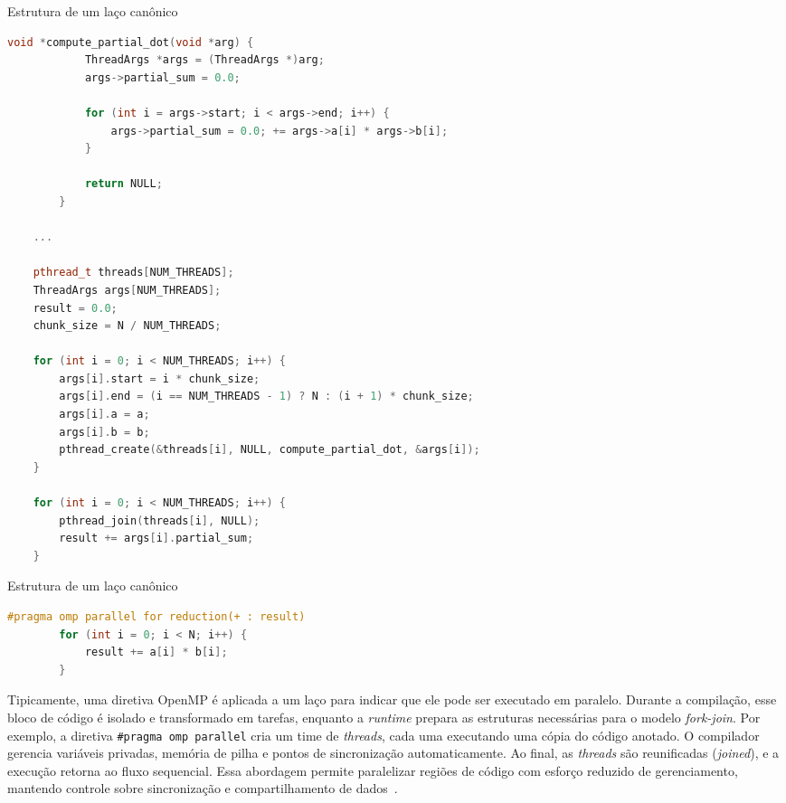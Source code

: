 \begin{sourcecode}[htb]\caption{\label{code:produtoThread}Estrutura de um laço canônico}
    \begin{lstlisting}[frame=single, language=C++]
        void *compute_partial_dot(void *arg) {
            ThreadArgs *args = (ThreadArgs *)arg;
            args->partial_sum = 0.0;
            
            for (int i = args->start; i < args->end; i++) {
                args->partial_sum = 0.0; += args->a[i] * args->b[i];
            }

            return NULL;
        }

    ...

    pthread_t threads[NUM_THREADS];
    ThreadArgs args[NUM_THREADS];
    result = 0.0;
    chunk_size = N / NUM_THREADS;

    for (int i = 0; i < NUM_THREADS; i++) {
        args[i].start = i * chunk_size;
        args[i].end = (i == NUM_THREADS - 1) ? N : (i + 1) * chunk_size;
        args[i].a = a;
        args[i].b = b;
        pthread_create(&threads[i], NULL, compute_partial_dot, &args[i]);
    }

    for (int i = 0; i < NUM_THREADS; i++) {
        pthread_join(threads[i], NULL);
        result += args[i].partial_sum;    
    }
    \end{lstlisting}
    \fonte{}
\end{sourcecode}

\begin{sourcecode}[htb]\caption{\label{code:produtoOmp}Estrutura de um laço canônico}
    \begin{lstlisting}[frame=single, language=C++]
        #pragma omp parallel for reduction(+ : result)
        for (int i = 0; i < N; i++) {
            result += a[i] * b[i];
        }
    \end{lstlisting}
    \fonte{}
\end{sourcecode}

Tipicamente, uma diretiva OpenMP é aplicada a um laço para indicar que ele pode ser executado em paralelo. Durante a compilação, esse bloco de código é isolado e transformado em tarefas, enquanto a \textit{runtime} prepara as estruturas necessárias para o modelo \textit{fork-join}. Por exemplo, a diretiva \texttt{\#pragma omp parallel} cria um time de \textit{threads}, cada uma executando uma cópia do código anotado. O compilador gerencia variáveis privadas, memória de pilha e pontos de sincronização automaticamente. Ao final, as \textit{threads} são reunificadas (\textit{joined}), e a execução retorna ao fluxo sequencial. Essa abordagem permite paralelizar regiões de código com esforço reduzido de gerenciamento, mantendo controle sobre sincronização e compartilhamento de dados~\cite{mattson2019}.

